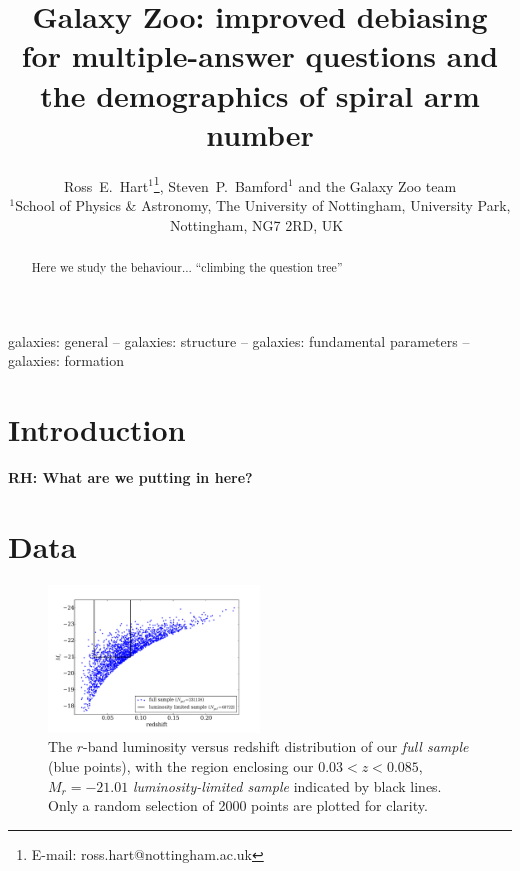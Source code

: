 \documentclass[useAMS,usenatbib]{mn2e}
\newcommand{\rh}[1]{{\bf \textcolor{RoyalPurple}{RH: #1}}}
\begin{document}
\title[Galaxy Zoo: debiasing and spiral arm number]{Galaxy Zoo: improved debiasing for multiple-answer questions and the demographics of spiral arm number}
\author[Hart et al.]{Ross~E.~Hart$^1$\thanks{E-mail: ross.hart@nottingham.ac.uk}, Steven~P.~Bamford$^1$ and the Galaxy Zoo team
\smallskip\\
$^{1}$School of Physics \& Astronomy, The University of Nottingham, University Park, Nottingham, NG7 2RD, UK\
}
\maketitle
\begin{abstract}
Here we study the behaviour...
``climbing the question tree''
\end{abstract}

\begin{keywords}
galaxies: general -- galaxies: structure -- galaxies: fundamental parameters -- galaxies: formation
\end{keywords}

\section{Introduction}
\label{sec:intro}

\rh{What are we putting in here?}

\section{Data}
\label{sec:data}

\begin{figure}
		\centering
		\includegraphics[width=0.5\textwidth]{Data_imgs/volume_limited_sample.pdf}
    \caption{The $r$-band luminosity versus redshift distribution of our \textit{full sample} (blue points), with the region enclosing our $0.03<z<0.085$, $M_r  = -21.01$ \textit{luminosity-limited sample} indicated by black lines. Only a random selection of 2000 points are plotted for clarity.
		\label{fig:vl_sample}}
\end{figure}
\end{document}
